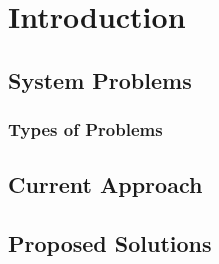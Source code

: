 \chapter{Introduction}
\section{System Problems}

\subsection{Types of Problems}

\section{Current Approach}

\section{Proposed Solutions}






